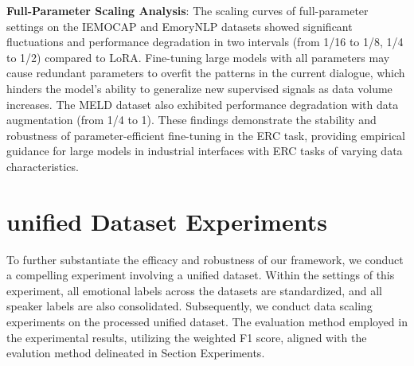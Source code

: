 \documentclass[conference]{IEEEtran}
\begin{document}
\textbf{Full-Parameter Scaling Analysis}: 
The scaling curves of full-parameter settings on the IEMOCAP and EmoryNLP datasets showed significant fluctuations and performance degradation in two intervals (from 1/16 to 1/8, 1/4 to 1/2) compared to LoRA. Fine-tuning large models with all parameters may cause redundant parameters to overfit the patterns in the current dialogue, which hinders the model's ability to generalize new supervised signals as data volume increases. The MELD dataset also exhibited performance degradation with data augmentation (from 1/4 to 1). These findings demonstrate the stability and robustness of parameter-efficient fine-tuning in the ERC task, providing empirical guidance for large models in industrial interfaces with ERC tasks of varying data characteristics.






























































\section{unified Dataset Experiments}


To further substantiate the efficacy and robustness of our framework, 
we conduct a compelling experiment involving a unified dataset.
Within the settings of this experiment, all emotional labels across the datasets are standardized, and all speaker labels are also consolidated.
Subsequently, we conduct data scaling experiments on the processed unified dataset.
The evaluation method employed in the experimental results, utilizing the weighted F1 score, aligned with the evalution method delineated in Section Experiments.
\end{document}
